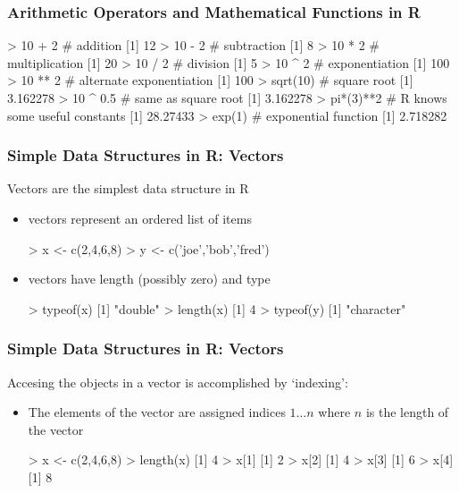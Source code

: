 \documentclass{beamer}
\begin{document}
\begin{frame}[fragile]
  \frametitle{Arithmetic Operators and Mathematical Functions in R}


\begin{Rcode}
> 10 + 2 # addition
[1] 12
> 10 - 2 # subtraction
[1] 8
> 10 * 2 # multiplication
[1] 20
> 10 / 2 # division
[1] 5
> 10 ^ 2 # exponentiation
[1] 100
> 10 ** 2 # alternate exponentiation
[1] 100
> sqrt(10) # square root
[1] 3.162278
> 10 ^ 0.5 # same as square root
[1] 3.162278
> pi*(3)**2  # R knows some useful constants
[1] 28.27433
> exp(1) # exponential function
[1] 2.718282
\end{Rcode}

\end{frame}


\begin{frame}[fragile]
  \frametitle{Simple Data Structures in R: Vectors}

Vectors are the simplest data structure in R
\begin{itemize}
	\item vectors represent an ordered list of items
\begin{Rcode}	
> x <- c(2,4,6,8)
> y <- c('joe','bob','fred')
\end{Rcode}

	\item vectors have length (possibly zero) and type
\begin{Rcode}	
> typeof(x)
[1] "double"
> length(x)
[1] 4		
> typeof(y)
[1] "character"
\end{Rcode}


\end{itemize}

\end{frame}

\begin{frame}[fragile]
  \frametitle{Simple Data Structures in R: Vectors}

Accesing the objects in a vector is accomplished by `indexing':
\begin{itemize}
	\item The elements of the vector are assigned indices $1 \ldots n$ where $n$ is the length of the vector
	
\begin{Rcode}	
> x <- c(2,4,6,8)
> length(x)
[1] 4
> x[1]
[1] 2
> x[2]
[1] 4
> x[3]
[1] 6
> x[4]
[1] 8
\end{Rcode}


\end{itemize}

\end{frame}
\end{document}

